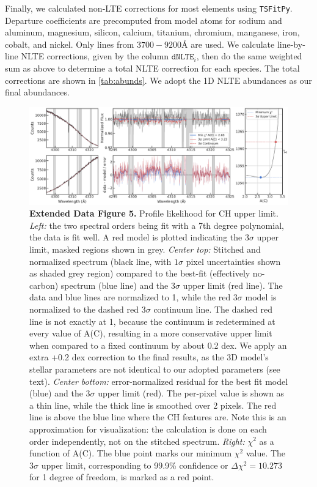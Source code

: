 \documentclass{natureprintstyle}
\newcommand{\code}[1]{\texttt{#1}\xspace}
\begin{document}
Finally, we calculated non-LTE corrections for most elements using \code{TSFitPy}.
Departure coefficients are precomputed from model atoms for
sodium and aluminum\cite{Ezzeddine2018}, 
magnesium\cite{Bergemann2017}, 
silicon\cite{Bergemann2013,EMagg2022}, 
calcium\cite{Mashonkina2017,Semenova2020},  
titanium\cite{Bergemann2011},
chromium\cite{BergemannCescutti2010},
manganese\cite{Bergemann2019},
iron\cite{Bergemann2012b,Semenova2020},
cobalt\cite{Bergemann2010,Yakovleva2020}, 
and nickel\cite{bergemann2021,Voronov2022}.
Only lines from $3700-9200${\AA} are used.
We calculate line-by-line NLTE corrections, given by the column $\code{dNLTE}_i$,
then do the same weighted sum as above to determine a total NLTE correction for each species.
The total corrections are shown in \ref{tab:abunds}.
We adopt the 1D NLTE abundances as our final abundances.


\begin{figure}
    \centering
    \includegraphics[width=\linewidth]{CFe_profilelikelihood_3DLTE.pdf}
    \caption{\textbf{Extended Data Figure 5.} Profile likelihood for CH upper limit. \textit{Left:} the two spectral orders being fit with a 7th degree polynomial, the data is fit well.
    A red model is plotted indicating the $3\sigma$ upper limit, masked regions shown in grey.
    \textit{Center top:} Stitched and normalized spectrum (black line, with $1\sigma$ pixel uncertainties shown as shaded grey region)
    compared to the best-fit (effectively no-carbon) spectrum (blue line) and the 3$\sigma$ upper limit (red line).
    The data and blue lines are normalized to 1, while the red $3\sigma$ model is normalized to the dashed red $3\sigma$ continuum line.
    The dashed red line is not exactly at 1, because the continuum is redetermined at every value of A(C), resulting in a more conservative upper limit when compared to a fixed continuum by about 0.2 dex.
    We apply an extra +0.2 dex correction to the final results, as the 3D model's stellar parameters are not identical to our adopted parameters (see text).
    \textit{Center bottom:} error-normalized residual for the best fit model (blue) and the $3\sigma$ upper limit (red). The per-pixel value is shown as a thin line, while the thick line is smoothed over 2 pixels.
    The red line is above the blue line where the CH features are.
    Note this is an approximation for visualization: the calculation is done on each order independently, not on the stitched spectrum.
    \textit{Right:} $\chi^2$ as a function of A(C).
    The blue point marks our minimum $\chi^2$ value.
    The $3\sigma$ upper limit, corresponding to 99.9\% confidence or $\Delta \chi^2 = 10.273$ for 1 degree of freedom, is marked as a red point.}
    \label{fig:chsynth}
\end{figure}
\end{document}
